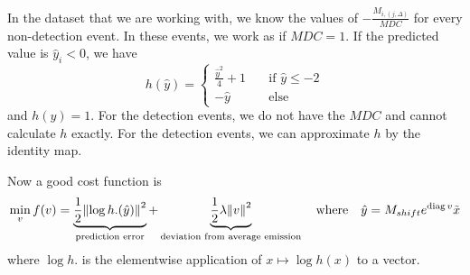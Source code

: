 \documentclass{article}
\begin{document}
In the dataset that we are working with, we know the values of $- \frac{M_{i,(j,\Delta)}}{MDC}$ for every non-detection event. In these events, we work as if $MDC = 1$. If the predicted value is $\hat{y}_i < 0$, we have 
$$
h\left(\hat{y}\right) = \begin{cases}
    \frac{\hat{y}^2}{4} + 1 &\quad\text{if } \hat{y} \le -2 \\
    -\hat{y} &\quad\text{else}
\end{cases}
$$
and $h(y) = 1$. For the detection events, we do not have the $MDC$ and cannot calculate $h$ exactly. For the detection events, we can approximate $h$ by the identity map.

Now a good cost function is
$$
\min_{v} f(v) =
\underbrace{\frac{1}{2}\norm{\log h.(\hat{y})}^2}_{\text{prediction error}} + \underbrace{\frac{1}{2}\lambda \norm{v}^2}_{\text{deviation from average emission}}
\quad\text{where}\quad 
\hat{y} = M_{shift} e^{\mathrm{diag}\, v} \tilde{x}
$$
where $\log h.$ is the elementwise application of $x \mapsto \log h(x)$ to a vector.
\end{document}
